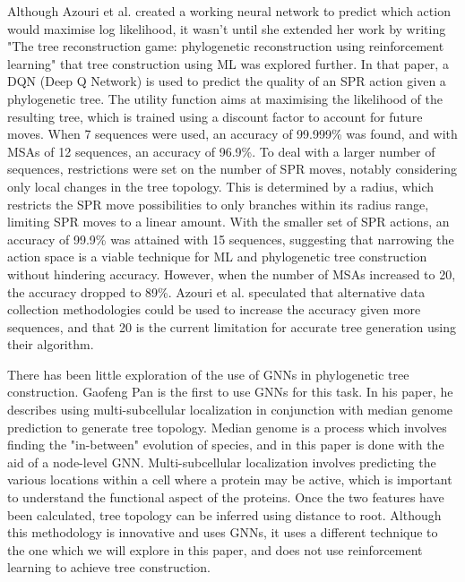 \documentclass{mpaper}
\begin{document}
Although Azouri et al. created a working neural network to predict which action would maximise log likelihood, it wasn't until she extended her work by writing "The tree reconstruction game: phylogenetic reconstruction using reinforcement learning" \cite{azouri2023tree} that tree construction using ML was explored further. In that paper, a DQN (Deep Q Network) is used to predict the quality of an SPR action given a phylogenetic tree. The utility function aims at maximising the likelihood of the resulting tree, which is trained using a discount factor to account for future moves. When 7 sequences were used, an accuracy of 99.999\% was found, and with MSAs of 12 sequences, an accuracy of 96.9\%. To deal with a larger number of sequences, restrictions were set on the number of SPR moves, notably considering only local changes in the tree topology. This is determined by a radius, which restricts the SPR move possibilities to only branches within its radius range, limiting SPR moves to a linear amount. With the smaller set of SPR actions, an accuracy of 99.9\% was attained with 15 sequences, suggesting that narrowing the action space is a viable technique for ML and phylogenetic tree construction without hindering accuracy. However, when the number of MSAs increased to 20, the accuracy dropped to 89\%. Azouri et al. speculated that alternative data collection methodologies could be used to increase the accuracy given more sequences, and that 20 is the current limitation for accurate tree generation using their algorithm.

There has been little exploration of the use of GNNs in phylogenetic tree construction. Gaofeng Pan \cite{pan2022graph} is the first to use GNNs for this task. In his paper, he describes using multi-subcellular localization in conjunction with median genome prediction to generate tree topology. Median genome is a process which involves finding the "in-between" evolution of species, and in this paper is done with the aid of a node-level GNN. Multi-subcellular localization involves predicting the various locations within a cell where a protein may be active, which is important to understand the functional aspect of the proteins. Once the two features have been calculated, tree topology can be inferred using distance to root. Although this methodology is innovative and uses GNNs, it uses a different technique to the one which we will explore in this paper, and does not use reinforcement learning to achieve tree construction.
\end{document}
